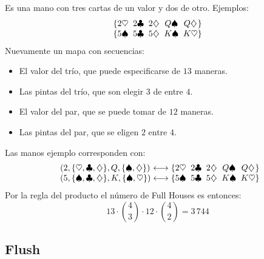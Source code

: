   Es una mano con tres cartas de un valor
  y dos de otro.
  Ejemplos:
  \begin{equation*}
    \begin{array}{@{\{}*{4}{c@{\;\;}}c@{\}}}
       2 \heartsuit & 2 \clubsuit & 2 \diamondsuit & Q \spadesuit
	  & Q \diamondsuit \\
       5 \spadesuit & 5 \clubsuit & 5 \diamondsuit & K \spadesuit
	  & K \heartsuit
    \end{array}
  \end{equation*}
  Nuevamente un mapa con secuencias:
  \begin{itemize}
  \item
    El valor del trío,
    que puede especificarse de \(13\) maneras.
  \item
    Las pintas del trío,
    que son elegir \(3\) de entre \(4\).
  \item
    El valor del par,
    que se puede tomar de \(12\) maneras.
  \item
    Las pintas del par,
    que se eligen \(2\) entre \(4\).
  \end{itemize}
  Las manos ejemplo corresponden con:
  \begin{equation*}
    \begin{array}{l@{{} \longleftrightarrow \{}*{4}{c@{\;\;}}c@{\}}}
      (2, \{\heartsuit, \clubsuit, \diamondsuit\},
       Q, \{\spadesuit, \diamondsuit\}) &
	 2 \heartsuit & 2 \clubsuit & 2 \diamondsuit & Q \spadesuit
	    & Q \diamondsuit \\
      (5, \{\spadesuit, \clubsuit, \diamondsuit\},
       K, \{\spadesuit, \heartsuit\})	&
	 5 \spadesuit & 5 \clubsuit & 5 \diamondsuit & K \spadesuit
	    & K \heartsuit
    \end{array}
  \end{equation*}
  Por la regla del producto%
  el número de \foreignlanguage{english}{Full Houses} es entonces:
  \begin{equation*}
    13 \cdot \binom{4}{3} \cdot 12 \cdot \binom{4}{2} = 3\,744
  \end{equation*}

\subsection{Flush}
\label{sec:flush}


